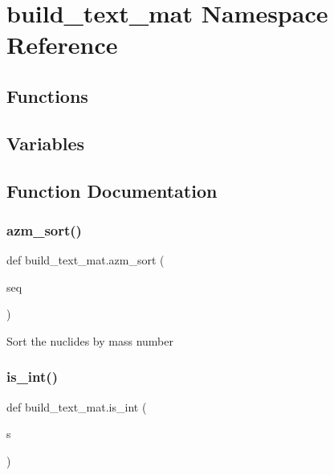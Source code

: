 \hypertarget{namespacebuild__text__mat}{}\section{build\+\_\+text\+\_\+mat Namespace Reference}
\label{namespacebuild__text__mat}
\subsection*{Functions}
\subsection*{Variables}


\subsection{Function Documentation}
\mbox{\label{namespacebuild__text__mat_aceb46b9cc97df9eba70c66a5330666e1}} 
\subsubsection{\texorpdfstring{azm\+\_\+sort()}{azm\_sort()}}
{\footnotesize\ttfamily def build\+\_\+text\+\_\+mat.\+azm\+\_\+sort (\begin{DoxyParamCaption}\item[{}]{seq }\end{DoxyParamCaption})}

\begin{DoxyVerb}Sort the nuclides by mass number\end{DoxyVerb}
 \mbox{\label{namespacebuild__text__mat_a2d34bf8acf7442d611f67de91e7f54d6}} 
\subsubsection{\texorpdfstring{is\+\_\+int()}{is\_int()}}
{\footnotesize\ttfamily def build\+\_\+text\+\_\+mat.\+is\+\_\+int (\begin{DoxyParamCaption}\item[{}]{s }\end{DoxyParamCaption})}

